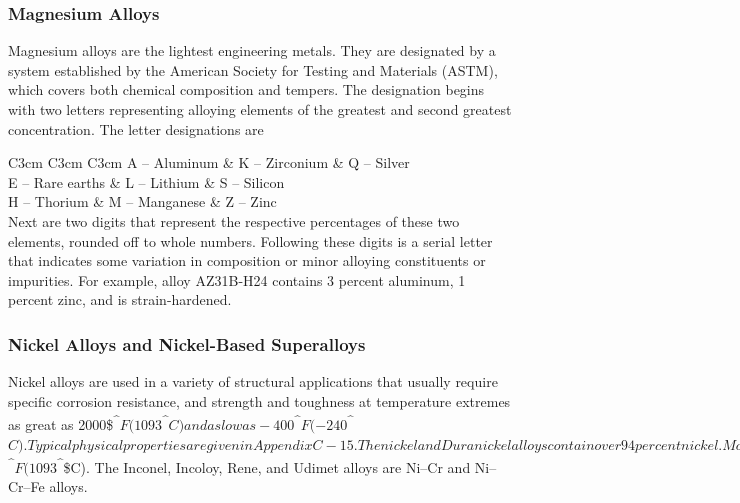 \documentclass[a4paper,openany,nobib]{tufte-book}
\begin{document}
\subsubsection{Magnesium Alloys}
\label{magnesium-alloys}
Magnesium alloys are the lightest engineering metals. They are
designated by a system established by the American Society for Testing
and Materials (ASTM), which covers both chemical composition and
tempers. The designation begins with two letters representing alloying
elements of the greatest and second greatest concentration. The letter
designations are


 C3cm C3cm C3cm A -- Aluminum \& K -- Zirconium \& Q -- Silver\\
E -- Rare earths \& L -- Lithium \& S -- Silicon\\
H -- Thorium \& M -- Manganese \& Z -- Zinc\\

Next are two digits that represent the respective percentages of these
two elements, rounded off to whole numbers. Following these digits is a
serial letter that indicates some variation in composition or minor
alloying constituents or impurities. For example, alloy AZ31B-H24
contains 3 percent aluminum, 1 percent zinc, and is strain-hardened.

\subsubsection{Nickel Alloys and Nickel-Based Superalloys}
\label{nickel-alloys-and-nickel-based-superalloys}
Nickel alloys are used in a variety of structural applications that
usually require specific corrosion resistance, and strength and
toughness at temperature extremes as great as 2000\$\textsuperscript{\^{}}\(F
(1093\)\textsuperscript{\^{}}\(C) and as low as -400\)\textsuperscript{\^{}}\(F (-240\)\textsuperscript{\^{}}\(C). Typical
physical properties are given in Appendix C-15. The nickel and
Duranickel alloys contain over 94 percent nickel. Monel represents a
series of nickel--copper alloys, based on the mutual solubility of these
two elements in all proportions. They are strong and tough at subzero
temperatures, and especially resistant to stress corrosion cracking.
Hastelloy designates a series of Ni--Mo and Ni--Mo--Cr superalloys.
Several Hastelloys resist oxidation and maintain useful strength and
creep properties in the range of 2000\)\textsuperscript{\^{}}\(F (1093\)\textsuperscript{\^{}}\$C). The
Inconel, Incoloy, Rene, and Udimet alloys are Ni--Cr and Ni--Cr--Fe
alloys.
\end{document}
